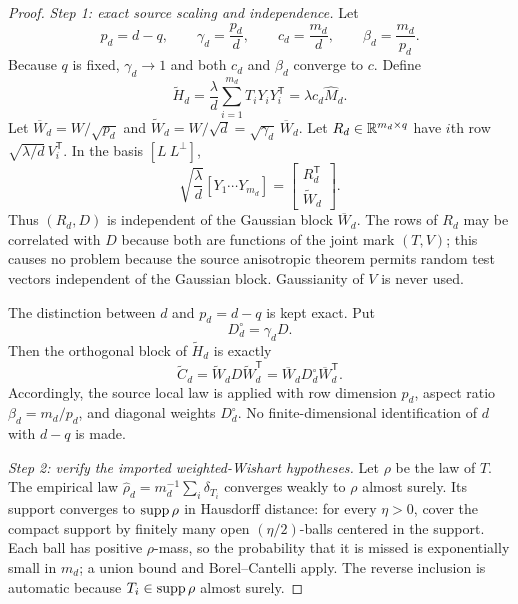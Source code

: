 \begin{proof}
\emph{Step 1: exact source scaling and independence.}
Let
\begin{equation}
p_d=d-q,
\qquad
\gamma_d=\frac{p_d}{d},
\qquad
c_d=\frac{m_d}{d},
\qquad
\beta_d=\frac{m_d}{p_d}.
\label{S:three-ratios}
\end{equation}
Because $q$ is fixed, $\gamma_d\to1$ and both $c_d$ and $\beta_d$
converge to $c$.  Define
\begin{equation}
\widetilde H_d
=
\frac{\lambda}{d}\sum_{i=1}^{m_d}T_iY_iY_i^{\mathsf T}
=
\lambda c_d\widehat M_d.
\label{S:source-scaling}
\end{equation}
Let $\overline W_d=W/\sqrt{p_d}$ and
$\widetilde W_d=W/\sqrt d=\sqrt{\gamma_d}\,\overline W_d$.  Let
$R_d\in\mathbb{R}^{m_d\times q}$ have $i$th row
$\sqrt{\lambda/d}\,V_i^{\mathsf T}$.  In the basis $[L\ L^\perp]$,
\begin{equation}
\sqrt{\frac{\lambda}{d}}[Y_1\cdots Y_{m_d}]
=
\begin{bmatrix}R_d^{\mathsf T}\\ \widetilde W_d\end{bmatrix}.
\label{S:mark-decomposition}
\end{equation}
Thus $(R_d,D)$ is independent of the Gaussian block
$\overline W_d$.  The rows of $R_d$ may be correlated with $D$ because
both are functions of the joint mark $(T,V)$; this causes no problem because
the source anisotropic theorem permits random test vectors independent of
the Gaussian block.  Gaussianity of $V$ is never used.

The distinction between $d$ and $p_d=d-q$ is kept exact.  Put
\begin{equation}
D_d^\circ=\gamma_dD.
\label{S:rescaled-D}
\end{equation}
Then the orthogonal block of $\widetilde H_d$ is exactly
\begin{equation}
\widetilde C_d
=
\widetilde W_dD\widetilde W_d^{\mathsf T}
=
\overline W_dD_d^\circ\overline W_d^{\mathsf T}.
\label{S:orthogonal-exact-scaling}
\end{equation}
Accordingly, the source local law is applied with row dimension $p_d$,
aspect ratio $\beta_d=m_d/p_d$, and diagonal weights $D_d^\circ$.
No finite-dimensional identification of $d$ with $d-q$ is made.

\emph{Step 2: verify the imported weighted-Wishart hypotheses.}
Let $\rho$ be the law of $T$.  The empirical law
$\widehat\rho_d=m_d^{-1}\sum_i\delta_{T_i}$ converges weakly to $\rho$
almost surely.  Its support converges to $\operatorname{supp}\rho$ in Hausdorff distance:
for every $\eta>0$, cover the compact support by finitely many open
$(\eta/2)$-balls centered in the support.  Each ball has positive $\rho$-mass,
so the probability that it is missed is exponentially small in $m_d$; a
union bound and Borel--Cantelli apply.  The reverse inclusion is automatic
because $T_i\in\operatorname{supp}\rho$ almost surely.


\end{proof}
